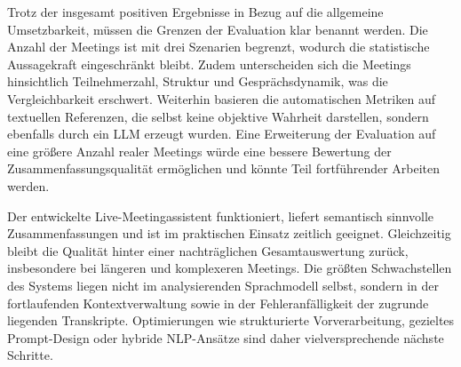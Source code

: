 Trotz der insgesamt positiven Ergebnisse in Bezug auf die allgemeine Umsetzbarkeit, müssen die Grenzen der Evaluation klar benannt werden. Die Anzahl der Meetings ist mit drei Szenarien begrenzt, wodurch die statistische Aussagekraft eingeschränkt bleibt. Zudem unterscheiden sich die Meetings hinsichtlich Teilnehmerzahl, Struktur und Gesprächsdynamik, was die Vergleichbarkeit erschwert. Weiterhin basieren die automatischen Metriken auf textuellen Referenzen, die selbst keine objektive Wahrheit darstellen, sondern ebenfalls durch ein LLM erzeugt wurden. Eine Erweiterung der Evaluation auf eine größere Anzahl realer Meetings würde eine bessere Bewertung der Zusammenfassungsqualität ermöglichen und könnte Teil fortführender Arbeiten werden.


Der entwickelte Live-Meetingassistent funktioniert, liefert semantisch sinnvolle Zusammenfassungen und ist im praktischen Einsatz zeitlich geeignet. Gleichzeitig bleibt die Qualität hinter einer nachträglichen Gesamtauswertung zurück, insbesondere bei längeren und komplexeren Meetings. Die größten Schwachstellen des Systems liegen nicht im analysierenden Sprachmodell selbst, sondern in der fortlaufenden Kontextverwaltung sowie in der Fehleranfälligkeit der zugrunde liegenden Transkripte. Optimierungen wie strukturierte Vorverarbeitung, gezieltes Prompt-Design oder hybride NLP-Ansätze sind daher vielversprechende nächste Schritte.

